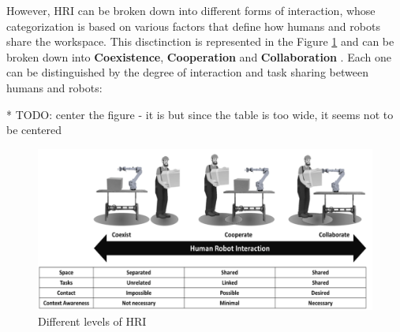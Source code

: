 However, \ac{HRI} can be broken down into different forms of interaction, whose categorization is based on various factors that define how 
humans and robots share the workspace. This disctinction is represented in the Figure \ref{fig:collab} and can be broken down into \textbf{Coexistence}, \textbf{Cooperation} and \textbf{Collaboration} \cite{Jahanmahin2022}. 
Each one can be distinguished by the degree of interaction and task sharing between humans and robots:

* TODO: center the figure - it is but since the table is too wide, it seems not to be centered
\begin{figure}[!htbp]
    \includegraphics[width=\linewidth]{figs/collab-coex-coopr.png}
    \caption{Different levels of \ac{HRI}~\cite{Jahanmahin2022}} 
    \label{fig:collab}
\end{figure} 


